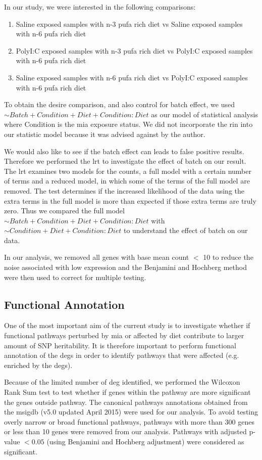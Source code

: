 \documentclass[12pt]{scrbook}
\begin{document}
In our study, we were interested in the following comparisons:
\begin{enumerate}
	\item Saline exposed samples with n-3 \gls{pufa} rich diet vs Saline exposed samples with n-6 \gls{pufa} rich diet 
	\item PolyI:C exposed samples with n-3 \gls{pufa} rich diet vs PolyI:C exposed samples with n-6 \gls{pufa} rich diet 
	\item Saline exposed samples with n-6 \gls{pufa} rich diet vs PolyI:C exposed samples with n-6 \gls{pufa} rich diet 
\end{enumerate}
To obtain the desire comparison, and also control for batch effect, we used $\sim Batch+Condition+Diet+Condition:Diet$ as our model of statistical analysis where Condition is the \gls{mia} exposure status.
We did not incorporate the \gls{rin} into our statistic model because it was advised against by the author.

We would also like to see if the batch effect can leads to false positive results.
Therefore we performed the \gls{lrt} to investigate the effect of batch on our result.
The \gls{lrt} examines two models for the counts, a full model with a certain number of terms and a reduced model, in which some of the terms of the full model are removed. 
The test determines if the increased likelihood of the data using the extra terms in the full model is more than expected if those extra terms are truly zero.
Thus we compared the full model $\sim Batch+Condition+Diet+Condition:Diet$ with $\sim Condition+Diet+Condition:Diet$ to understand the effect of batch on our data.

In our analysis, we removed all genes with base mean count $<$ 10  to reduce the noise associated with low expression and the Benjamini and Hochberg method were then used to correct for multiple testing.

\subsection{Functional Annotation}
\label{sec:function}
One of the most important aim of the current study is to investigate whether if functional pathways perturbed by \gls{mia} or affected by diet contribute to larger amount of \gls{SNP} heritability.
It is therefore important to perform functional annotation of the \glspl{deg} in order to identify pathways that were affected (e.g. enriched by the \glspl{deg}).

Because of the limited number of \gls{deg} identified, we performed the Wilcoxon Rank Sum test to test whether if genes within the pathway are more significant the genes outside pathway.
The canonical pathways annotations obtained from the \gls{msigdb} (v5.0 updated April 2015) \citep{Subramanian2005} were used for our analysis.
To avoid testing overly narrow or broad functional pathways, pathways with more than 300 genes or less than 10 genes were removed from our analysis. 
Pathways with adjusted p-value $<0.05$ (using Benjamini and Hochberg adjustment) were considered as significant.
\end{document}
